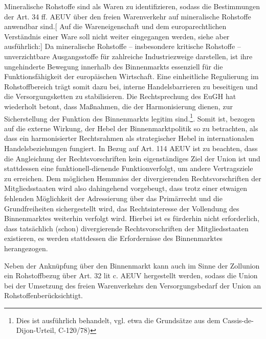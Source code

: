\documentclass[12pt,a4paper,oneside]{book} %
\begin{document}
Mineralische Rohstoffe sind als Waren zu identifizieren, sodass die Bestimmungen der Art. 34 ff. AEUV über den freien Warenverkehr auf mineralische Rohstoffe anwendbar sind.[ Auf die Wareneigenschaft und dem europarechtlichen Verständnis einer Ware soll nicht weiter eingegangen werden, siehe aber ausführlich:]\autocite{Schorkopf, Rohstoffverwaltung, Rn. 6} Da mineralische Rohstoffe – insbesondere kritische Rohstoffe – unverzichtbare Ausgangsstoffe für zahlreiche Industriezweige darstellen, ist ihre ungehinderte Bewegung innerhalb des Binnenmarkts essenziell für die Funktionsfähigkeit der europäischen Wirtschaft. Eine einheitliche Regulierung im Rohstoffbereich trägt somit dazu bei, interne Handelsbarrieren zu beseitigen und die Versorgungsketten zu stabilisieren. Die Rechtsprechung des EuGH hat wiederholt betont, dass Maßnahmen, die der Harmonisierung dienen, zur Sicherstellung der Funktion des Binnenmarkts legitim sind.\footnote{Dies ist ausführlich behandelt, vgl. etwa die Grundsätze aus dem Cassis-de-Dijon-Urteil, C-120/78)}. Somit ist, bezogen auf die externe Wirkung, der Hebel der Binnenmarktpolitik so zu betrachten, als dass ein harmonisierter Rechtsrahmen als strategischer Hebel in internationalen Handelsbeziehungen fungiert.
In Bezug auf Art. 114 AEUV ist zu beachten, dass die Angleichung der Rechtsvorschriften kein eigenständiges Ziel der Union ist und stattdessen eine \glqq funktionell-dienende Funktion\grqq verfolgt, um andere Vertragsziele zu erreichen.\autocites{Streinz, EUV/AEUV Art. 114, Rn. 5}{Calliess/Ruffert, EUV/AEUV, Art. 114, Rn. 2}{Grabitz/Hilf/Nettesheim/Tietje, 83. EL Juli 2024, AEUV Art. 114 Rn. 6} Dem möglichen Hemmniss der divergierenden Rechtsvorschriften der Mitgliedsstaaten wird also dahingehend vorgebeugt, dass trotz einer etwaigen fehlenden Möglichkeit der Adressierung über das Primärrecht und die Grundfreiheiten sichergestellt wird, das Rechtsinteresse der Vollendung des Binnenmarktes weiterhin verfolgt wird.\autocite{Streinz, EUV/AEUV Art. 114, Rn. 5f.} Hierbei ist es fürderhin nicht erforderlich, dass tatsächlich (schon) divergierende Rechtsvorschriften der Mitgliedsstaaten existieren, es werden stattdessen die Erfordernisse des Binnenmarktes herangezogen.\autocite{Streinz/M. Schröder AEUV Art. 114 Rn. 40}

Neben der Anknüpfung über den Binnenmarkt kann auch im Sinne der Zollunion ein Rohstoffbezug über Art. 32 lit c. AEUV hergestellt werden, sodass die Union bei der Umsetzung des freien Warenverkehrs den \glqq Versorgungsbedarf der Union an Rohstoffen\grqq berücksichtigt.
\end{document}

